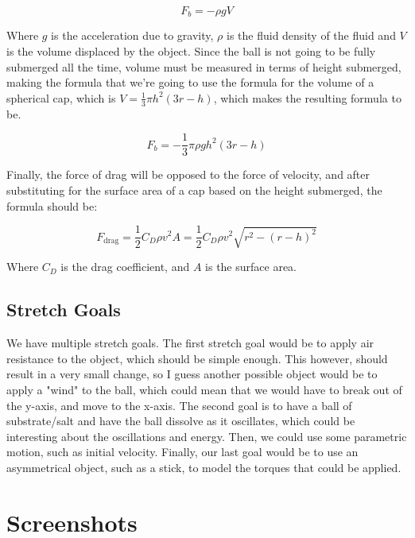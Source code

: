 \documentclass{article}
\begin{document}
$$F_b = -\rho gV$$

Where $g$ is the acceleration due to gravity, $\rho$ is the fluid density of the fluid and $V$ is the volume displaced by the object. Since the ball is not going to be fully submerged all the time, volume must be measured in terms of height submerged, making the formula that we're going to use the formula for the volume of a spherical cap, which is $V = \frac{1}{3}\pi h^2 (3r - h)$, which makes the resulting formula to be.

$$F_b = - \frac{1}{3} \pi \rho g h^2 (3r - h)$$

Finally, the force of drag will be opposed to the force of velocity, and after substituting for the surface area of a cap based on the height submerged, the formula should be:

$$F_{\text{drag}} = \frac{1}{2} C_D \rho v^2 A = \frac{1}{2} C_D \rho v^2 \sqrt{r^2 - (r-h)^2}$$

Where $C_D$ is the drag coefficient, and $A$ is the surface area.

\subsection{Stretch Goals}

We have multiple stretch goals. The first stretch goal would be to apply air resistance to the object, which should be simple enough. This however, should result in a very small change, so I guess another possible object would be to apply a "wind" to the ball, which could mean that we would have to break out of the y-axis, and move to the x-axis. The second goal is to have a ball of substrate/salt and have the ball dissolve as it oscillates, which could be interesting about the oscillations and energy. Then, we could use some parametric motion, such as initial velocity. Finally, our last goal would be to use an asymmetrical object, such as a stick, to model the torques that could be applied.

\break

\section{Screenshots}
\end{document}
